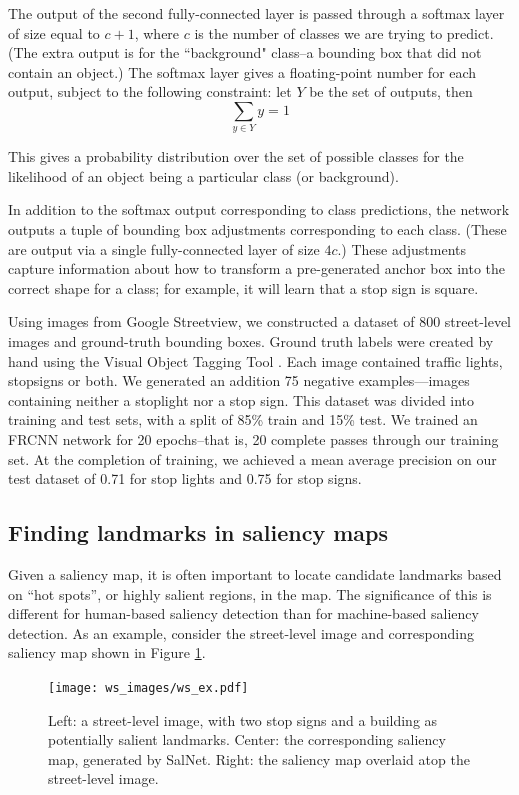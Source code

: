 The output of the second fully-connected layer is passed through a softmax layer of size equal to $c + 1$, where $c$ is the number of classes we are trying to predict. (The extra output is for the ``background" class--a bounding box that did not contain an object.)  The softmax layer gives a floating-point number for each output, subject to the following constraint: let $Y$ be the set of outputs, then 
\begin{equation}
    \sum\limits_{y \in Y} y = 1
\end{equation}

This gives a probability distribution over the set of possible classes for the likelihood of an object being a particular class (or background).

In addition to the softmax output corresponding to class predictions, the network outputs a tuple of bounding box adjustments corresponding to each class. (These are output via a single fully-connected layer of size $4c$.) These adjustments capture information about how to transform a pre-generated anchor box into the correct shape for a class; for example, it will learn that a stop sign is square.

Using images from Google Streetview, we constructed a dataset of 800 street-level images and ground-truth bounding boxes. Ground truth labels were created by hand using the Visual Object Tagging Tool \cite{vott}. Each image contained traffic lights, stopsigns or both. We generated an addition 75 negative examples---images containing neither a stoplight nor a stop sign. This dataset was divided into training and test sets, with a split of 85\% train and 15\% test. We trained an FRCNN network for 20 epochs--that is, 20 complete passes through our training set. At the completion of training, we achieved a mean average precision on our test dataset of 0.71 for stop lights and 0.75 for stop signs.

\subsection{Finding landmarks in saliency maps}\label{Sect:watershed}
Given a saliency map, it is often important to locate candidate landmarks based on “hot spots”, or highly salient regions, in the map. The significance of this is different for human-based saliency detection than for machine-based saliency detection. As an example, consider the street-level image and corresponding saliency map shown in Figure \ref{fig:ws:ex}.

\begin{figure}[htbp]
  \centering
  \texttt{[image: ws\_images/ws\_ex.pdf]}
  \caption{Left: a street-level image, with two stop signs and a building as potentially salient landmarks. Center: the corresponding saliency map, generated by SalNet. Right: the saliency map overlaid atop the street-level image.}
  \label{fig:ws:ex}
\end{figure}

